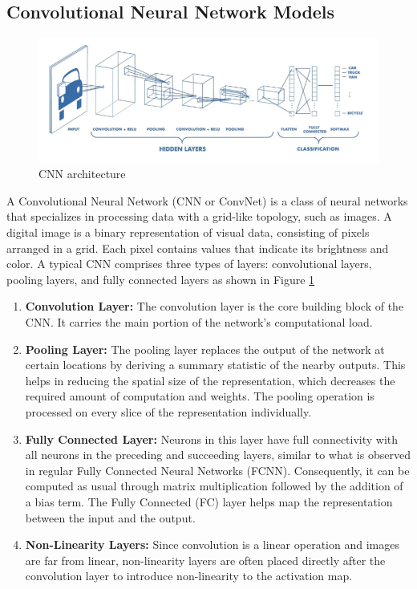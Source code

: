 \subsection{Convolutional Neural Network Models}

\begin{figure}
\centering
\includegraphics[width=\linewidth]{cnn.PNG}
\caption{CNN architecture}
\label{fig:cnn}
\end{figure}

A Convolutional Neural Network (CNN or ConvNet) is a class of neural networks that specializes in processing data with a grid-like topology, such as images. A digital image is a binary representation of visual data, consisting of pixels arranged in a grid. Each pixel contains values that indicate its brightness and color. A typical CNN comprises three types of layers: convolutional layers, pooling layers, and fully connected layers as shown in Figure \ref{fig:cnn}

\begin{enumerate}
    \item \textbf{Convolution Layer:} The convolution layer is the core building block of the CNN. It carries the main portion of the network’s computational load.
    \item \textbf{Pooling Layer:} The pooling layer replaces the output of the network at certain locations by deriving a summary statistic of the nearby outputs. This helps in reducing the spatial size of the representation, which decreases the required amount of computation and weights. The pooling operation is processed on every slice of the representation individually.
    \item \textbf{Fully Connected Layer:} Neurons in this layer have full connectivity with all neurons in the preceding and succeeding layers, similar to what is observed in regular Fully Connected Neural Networks (FCNN). Consequently, it can be computed as usual through matrix multiplication followed by the addition of a bias term. The Fully Connected (FC) layer helps map the representation between the input and the output.
    \item \textbf{Non-Linearity Layers:} Since convolution is a linear operation and images are far from linear, non-linearity layers are often placed directly after the convolution layer to introduce non-linearity to the activation map.
\end{enumerate}

